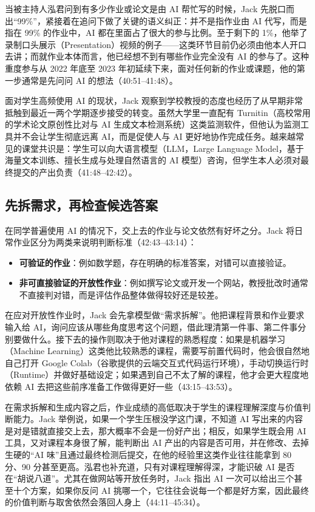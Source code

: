 \documentclass[UTF8,a4paper,11pt,fontset=fandol]{ctexart}
\begin{document}
当被主持人泓君问到有多少作业或论文是由 AI 帮忙写的时候，Jack 先脱口而出“99\%”，紧接着在追问下做了关键的语义纠正：并不是指作业由 AI 代写，而是指在 99\% 的作业中，AI 都在里面占了很大的参与比例。至于剩下的 1\%，他举了录制口头展示（Presentation）视频的例子——这类环节目前仍必须由他本人开口去讲；而就作业本体而言，他已经想不到有哪些作业完全没有 AI 的参与了。这种重度参与从 2022 年底至 2023 年初延续下来，面对任何新的作业或课题，他的第一步通常是先问问 AI 的想法（40:51–41:48）。

面对学生高频使用 AI 的现状，Jack 观察到学校教授的态度也经历了从早期非常抵触到最近一两个学期逐步接受的转变。虽然大学里一直配有 Turnitin（高校常用的学术论文原创性比对与 AI 生成文本检测系统）这类监测软件，但他认为监测工具并不会让学生彻底远离 AI，而是促使人与 AI 更好地协作完成任务。越来越常见的课堂共识是：学生可以向大语言模型（LLM，Large Language Model，基于海量文本训练、擅长生成与处理自然语言的 AI 模型）咨询，但学生本人必须对最终提交的产出负责（41:48–42:42）。

\subsection{先拆需求，再检查候选答案}
在同学普遍使用 AI 的情况下，交上去的作业与论文依然有好坏之分。Jack 将日常作业区分为两类来说明判断标准（42:43–43:14）：
\begin{itemize}
\item \textbf{可验证的作业}：例如数学题，存在明确的标准答案，对错可以直接验证。
\item \textbf{非可直接验证的开放性作业}：例如撰写论文或开发一个网站，教授批改时通常不直接判对错，而是评估作品整体做得较好还是较差。
\end{itemize}

在应对开放性作业时，Jack 会先拿模型做“需求拆解”。他把课程背景和作业要求输入给 AI，询问应该从哪些角度思考这个问题，借此理清第一件事、第二件事分别要做什么。接下去的操作则取决于他对课程的熟悉程度：如果是机器学习（Machine Learning）这类他比较熟悉的课程，需要写前置代码时，他会很自然地自己打开 Google Colab（谷歌提供的云端交互式代码运行环境），手动切换运行时（Runtime）并做好基础设定；如果遇到自己不太了解的课程，他才会更大程度地依赖 AI 去把这些前序准备工作做得更好一些（43:15–43:53）。

在需求拆解和生成内容之后，作业成绩的高低取决于学生的课程理解深度与价值判断能力。Jack 举例说，如果一个学生压根没学这门课，不知道 AI 写出来的内容是对是错就直接交上去，那大概率不会是一份好产出；相反，如果学生既会用 AI 工具，又对课程本身很了解，能判断出 AI 产出的内容是否可用，并在修改、去掉生硬的“AI 味”且通过最终检测后提交，在他的经验里这类作业往往能拿到 80 分、90 分甚至更高。泓君也补充道，只有对课程理解得深，才能识破 AI 是否在“胡说八道”。尤其在做网站等开放任务时，Jack 指出 AI 一次可以给出三个甚至十个方案，如果你反问 AI 挑哪一个，它往往会说每一个都是好方案，因此最终的价值判断与取舍依然会落回人身上（44:11–45:34）。
\end{document}
